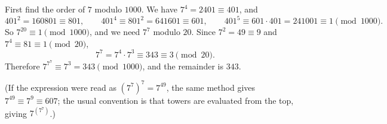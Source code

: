 First find the order of $7$ modulo $1000$. We have $7^4=2401\equiv401$, and
\[
401^2=160801\equiv801,\qquad 401^4\equiv801^2=641601\equiv601,\qquad 401^5\equiv601\cdot401=241001\equiv1 \pmod{1000}.
\]
So $7^{20}\equiv1\pmod{1000}$, and we need $7^7$ modulo $20$. Since $7^2=49\equiv9$ and $7^4\equiv81\equiv1\pmod{20}$,
\[
7^7=7^4\cdot7^3\equiv343\equiv3\pmod{20}.
\]
Therefore $7^{7^7}\equiv7^3=343\pmod{1000}$, and the remainder is $\boxed{343}$.

(If the expression were read as $\left(7^7\right)^7=7^{49}$, the same method gives $7^{49}\equiv7^{9}\equiv607$; the usual convention is that towers are evaluated from the top, giving $7^{\left(7^7\right)}$.)
